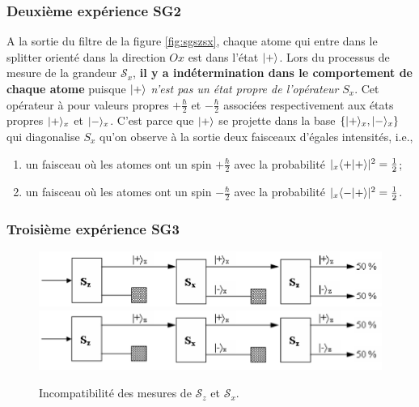 \subsubsection{Deuxième expérience SG2}

A la sortie du filtre de la figure \ref{fig:sgszsx}, chaque atome qui entre
dans le splitter orienté dans la direction $Ox$ est dans l'état $\vert+\rangle$. Lors
du processus de mesure de la grandeur $\mathcal{S}_{x}$, \textbf{il y a
indétermination dans le comportement de chaque atome} puisque $\vert+\rangle$
\emph{n'est pas un état propre de l'opérateur} $S_{x}$. Cet
opérateur à pour valeurs propres $+\frac{\hbar}{2}$ et $-\frac{\hbar}{2}$
associées respectivement aux états propres $\vert+\rangle_{x}$ et
$\vert-\rangle_{x}$. C'est parce que $\vert+\rangle$ se projette dans la base $\{
\vert+\rangle_{x},\vert-\rangle_{x}\}$ qui diagonalise $S_{x}$ qu'on observe à la sortie
deux faisceaux d'égales intensités, i.e.,

\begin{enumerate}
\item un faisceau où les atomes ont un spin $+\frac{\hbar}{2}$ avec la
probabilité $|_{x}\langle+\vert+\rangle|^{2}=\frac{1}{2}$;

\item un faisceau où les atomes ont un spin $-\frac{\hbar}{2}$ avec la
probabilité $|_{x}\langle-\vert+\rangle|^{2}=\frac{1}{2}$.
\end{enumerate}

\subsubsection{Troisième expérience SG3}

\begin{figure}[ptbh]
\centering
\ifcase\msipdfoutput
	\includegraphics[scale=.9]{graphics/SGSzSxSzP.eps}
\else
	\includegraphics[scale=.9]{graphics/SGSzSxSzP.pdf}
\fi
\caption{Incompatibilité des mesures de $\mathcal{S}_{z}$ et $\mathcal{S}_{x}$.}
\label{fig:sgszsxszp}%
\end{figure}

